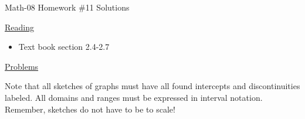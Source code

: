\documentclass[letterpaper,12pt,fleqn]{article}
\begin{document}
\begin{center}
\Large Math-08 Homework \#11 Solutions
\end{center}

\vspace{0.5in}

\underline{Reading}

\begin{itemize}
\item Text book section 2.4-2.7
\end{itemize}

\underline{Problems}

Note that all sketches of graphs must have all found intercepts and
discontinuities labeled. All domains and ranges must be expressed in
interval notation. Remember, sketches do not have to be to scale!
\end{document}
